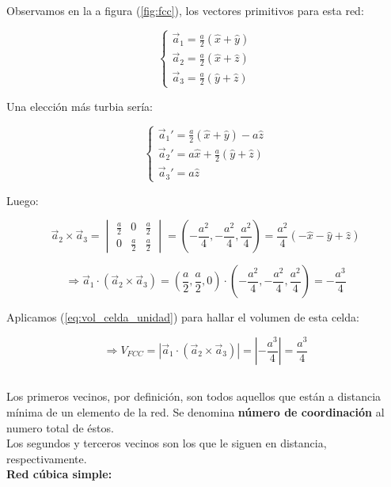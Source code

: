 \documentclass[a4paper]{article}
\begin{document}
Observamos en la a figura (\ref{fig:fcc}), los vectores primitivos para esta red:

$$\begin{cases}
\vec{a}_{1} = \frac{a}{2}(\hat{x} + \hat{y}) \\
\vec{a}_{2} = \frac{a}{2}(\hat{x} + \hat{z}) \\
\vec{a}_{3} = \frac{a}{2}(\hat{y} + \hat{z})
\end{cases}$$

Una elecci\'on m\'as turbia ser\'ia:

$$\begin{cases}
\vec{a}_{1}' = \frac{a}{2}(\hat{x} + \hat{y}) - a\hat{z} \\
\vec{a}_{2}' = a\hat{x} + \frac{a}{2}(\hat{y} + \hat{z}) \\
\vec{a}_{3}' = a\hat{z}
\end{cases}$$

Luego:

$$ \vec{a}_{2} \times \vec{a}_{3} = \begin{vmatrix}
\frac{a}{2} & 0 & \frac{a}{2} \\ 
0 & \frac{a}{2} & \frac{a}{2}
\end{vmatrix}  = (-\frac{a^{2}}{4}, -\frac{a^{2}}{4}, \frac{a^{2}}{4}) = \frac{a^{2}}{4}(- \hat{x} - \hat{y} + \hat{z})$$

$$ \Rightarrow \vec{a}_{1} \cdot (\vec{a}_{2} \times \vec{a}_{3}) = (\frac{a}{2}, \frac{a}{2}, 0) \cdot (-\frac{a^{2}}{4}, -\frac{a^{2}}{4}, \frac{a^{2}}{4}) = -\frac{a^{3}}{4}$$

Aplicamos (\ref{eq:vol_celda_unidad}) para hallar el volumen de esta celda:

$$ \Rightarrow V_{FCC} = | \vec{a}_{1} \cdot (\vec{a}_{2} \times \vec{a}_{3})| = |-\frac{a^{3}}{4}| = \frac{a^{3}}{4}$$

\subsection{}

Los primeros vecinos, por definici\'on, son todos aquellos que est\'an a distancia m\'inima de un elemento de la red. Se denomina \textbf{n\'umero de coordinaci\'on} al numero total de \'estos.\\

Los segundos y terceros vecinos son los que le siguen en distancia, respectivamente.\\

\textbf{Red c\'ubica simple:}\\
\end{document}
